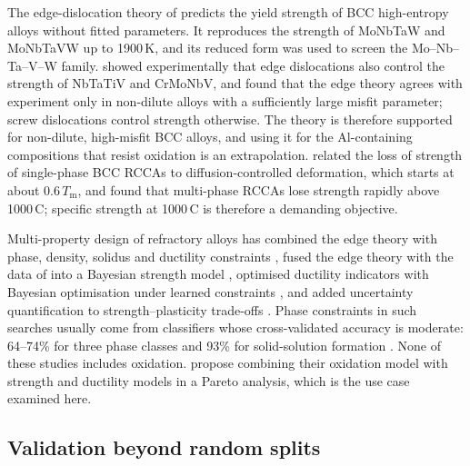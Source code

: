 The edge-dislocation theory of \citet{maresca2020mechanistic} predicts the yield strength of BCC
high-entropy alloys without fitted parameters. It reproduces the strength of MoNbTaW and MoNbTaVW
up to 1900\,K, and its reduced form was used to screen the Mo--Nb--Ta--V--W family.
\citet{lee2021strength} showed experimentally that edge dislocations also control the strength of
NbTaTiV and CrMoNbV, and \citet{baruffi2022screw} found that the edge theory agrees with experiment
only in non-dilute alloys with a sufficiently large misfit parameter; screw dislocations control
strength otherwise. The theory is therefore supported for non-dilute, high-misfit BCC alloys, and
using it for the Al-containing compositions that resist oxidation is an extrapolation.
\citet{senkov2019high} related the loss of strength of single-phase BCC RCCAs to diffusion-controlled
deformation, which starts at about 0.6\,$T_\mathrm{m}$, and found that multi-phase RCCAs lose strength
rapidly above 1000\,\textdegree C; specific strength at 1000\,\textdegree C is therefore a demanding
objective.

Multi-property design of refractory alloys has combined the edge theory with phase, density, solidus
and ductility constraints \citep{vela2023high}, fused the edge theory with the data of
\citet{borg2020expanded} into a Bayesian strength model \citep{vela2023data}, optimised ductility
indicators with Bayesian optimisation under learned constraints \citep{khatamsaz2022multi}, and added
uncertainty quantification to strength--plasticity trade-offs \citep{giles2026yield}. Phase
constraints in such searches usually come from classifiers whose cross-validated accuracy is
moderate: 64--74\% for three phase classes \citep{huang2019machine} and 93\% for solid-solution
formation \citep{pei2020machine}. None of these studies includes oxidation. \citet{gorsse2025ml}
propose combining their oxidation model with strength and ductility models in a Pareto analysis,
which is the use case examined here.

\subsection{Validation beyond random splits}

